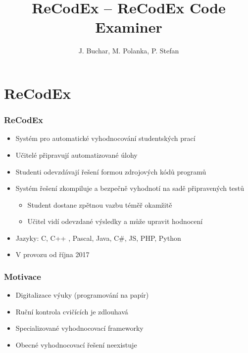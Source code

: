 \documentclass{beamer}
\begin{document}

\title[ReCodEx -- ReCodEx Code Examiner] %
{ReCodEx -- ReCodEx Code Examiner}
\author[Buchar, Polanka, Stefan]{J. Buchar, M. Polanka, P. Stefan}
\date[30. 1. 2018]{} %
\subject{Computer Science}

\frame{\titlepage}

\section{ReCodEx}

\begin{frame}
	\frametitle{ReCodEx}
	\begin{itemize}
		\item Systém pro automatické vyhodnocování studentských prací
		\item Učitelé připravují automatizované úlohy
		\item Studenti odevzdávají řešení formou zdrojových kódů programů
		\item Systém řešení zkompiluje a bezpečně vyhodnotí na sadě připravených testů
		\begin{itemize}
			\item Student dostane zpětnou vazbu téměř okamžitě
			\item Učitel vidí odevzdané výsledky a může upravit hodnocení
		\end{itemize}
		\item Jazyky: C, C++ , Pascal, Java, C\#, JS, PHP, Python
		\item V provozu od října 2017
	\end{itemize}
\end{frame}

\begin{frame}
	\frametitle{Motivace}
	\begin{itemize}
		\item Digitalizace výuky (programování na papír)
		\item Ruční kontrola cvičících je zdlouhavá
		\item Specializované vyhodnocovací frameworky
		\item Obecné vyhodnocovací řešení neexistuje
	\end{itemize}
\end{frame}
\end{document}
